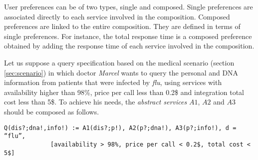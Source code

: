 User preferences can be of two types, single and composed. Single preferences
are associated directly to each service involved in the composition. Composed
preferences are linked to the entire composition. They are defined in terms of
single preferences. For instance, the total response time is a composed
preference obtained by adding the response time of each service involved in the composition.

Let us suppose a query specification based on the medical scenario (section \ref{sec:scenario}) in which doctor \textit{Marcel} wants to query the personal and DNA information from patients that were infected by \textit{flu}, using services with availability higher than 98\%, price per call less than 0.2\$ and integration total cost less than 5\$.
To achieve his needs, the \textit{abstract services} $A1$, $A2$ and $A3$ should be composed as follows. 

\begin{small}
\begin{verbatim}
Q(dis?;dna!,info!) := A1(dis?;p!), A2(p?;dna!), A3(p?;info!), d = “flu”,
             [availability > 98%, price per call < 0.2$, total cost < 5$]
\end{verbatim}
\end{small}
%
%

